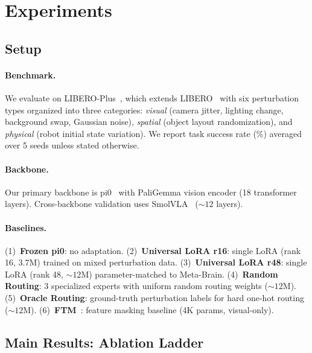 \documentclass[10pt,twocolumn]{article}
\newcommand{\ours}{Meta-Brain}
\newcommand{\liplus}{LIBERO-Plus}
\begin{document}
\section{Experiments}
\label{sec:experiments}

\subsection{Setup}
\label{sec:setup}

\paragraph{Benchmark.}
We evaluate on \liplus{}~\cite{liberoplus2026}, which extends LIBERO~\cite{liu2023libero} with six perturbation types organized into three categories: \textit{visual} (camera jitter, lighting change, background swap, Gaussian noise), \textit{spatial} (object layout randomization), and \textit{physical} (robot initial state variation).
We report task success rate (\%) averaged over 5 seeds unless stated otherwise.

\paragraph{Backbone.}
Our primary backbone is pi0~\cite{black2024pi0} with PaliGemma vision encoder (18 transformer layers).
Cross-backbone validation uses SmolVLA~\cite{smolvla2025} (${\sim}12$ layers).

\paragraph{Baselines.}
(1)~\textbf{Frozen pi0}: no adaptation.
(2)~\textbf{Universal LoRA r16}: single LoRA (rank 16, 3.7M) trained on mixed perturbation data.
(3)~\textbf{Universal LoRA r48}: single LoRA (rank 48, ${\sim}12$M) parameter-matched to \ours{}.
(4)~\textbf{Random Routing}: 3 specialized experts with uniform random routing weights (${\sim}12$M).
(5)~\textbf{Oracle Routing}: ground-truth perturbation labels for hard one-hot routing (${\sim}12$M).
(6)~\textbf{FTM}~\cite{yang2025ftm}: feature masking baseline (4K params, visual-only).


\subsection{Main Results: Ablation Ladder}
\label{sec:main_results}
\end{document}
